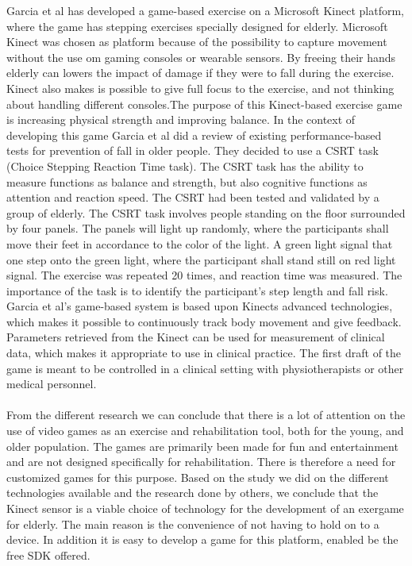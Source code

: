 Garcia et al has developed a game-based exercise on a Microsoft Kinect platform, where the game has stepping exercises specially designed for elderly. Microsoft Kinect was chosen as platform because of the possibility to capture movement without the use om gaming consoles or wearable sensors. By freeing their hands elderly can lowers the impact of damage if they were to fall during the exercise. Kinect also makes is possible to give full focus to the exercise, and not thinking about handling different consoles.The purpose of this Kinect-based exercise game is increasing physical strength and improving balance. In the context of developing this game Garcia et al did a review of existing performance-based tests for prevention of fall in older people. They decided to use a CSRT task (Choice Stepping Reaction Time task). The CSRT task has the ability to measure functions as balance and strength, but also cognitive functions as attention and reaction speed. The CSRT had been tested and validated by a group of elderly. The CSRT task involves people standing on the floor surrounded by four panels. The panels will light up randomly, where the participants shall move their feet in accordance to the color of the light. A green light signal that one step onto the green light, where the participant shall stand still on red light signal. The exercise was repeated 20 times, and reaction time was measured. The importance of the task is to identify the participant's step length and fall risk. Garcia et al’s game-based system is based upon Kinects advanced technologies, which makes it possible to continuously track body movement and give feedback. Parameters retrieved from the Kinect can be used for measurement of clinical data, which makes it appropriate to use in clinical practice. The first draft of the game is meant to be controlled in a clinical setting with physiotherapists or other medical personnel. \cite{garcia2012exergames} \\ \\
From the different research we can conclude that there is a lot of attention on the use of video games as an exercise and rehabilitation tool, both for the young, and older population. The games are primarily been made for fun and entertainment and are not designed specifically for rehabilitation. There is therefore a need for customized games for this purpose. Based on the study we did on the different technologies available and the research done by others, we conclude that the Kinect sensor is a viable choice of technology for the development of an exergame for elderly. The main reason is the convenience of not having to hold on to a device. In addition it is easy to develop a game for this platform, enabled be the free SDK offered. 





